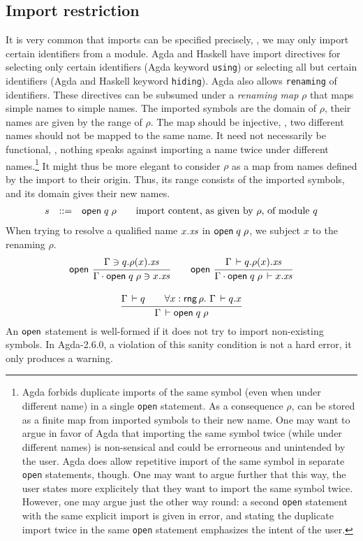 \documentclass{article}
\theoremstyle{definition}
\theoremstyle{plain}
\theoremstyle{remark}
\begin{document}
\subsection{Import restriction}

It is very common that imports can be specified precisely, \ie, we may
only import certain identifiers from a module.  Agda and Haskell have
import directives for selecting only certain identifiers (Agda keyword
\texttt{using}) or selecting all but certain identifiers (Agda and
Haskell keyword \texttt{hiding}).  Agda also allows \texttt{renaming}
of identifiers.  These directives can be subsumed under a
\emph{renaming map} $\rho$ that maps simple names to simple names.
The imported symbols are the domain of $\rho$, their names are
given by the range of $\rho$.  The map should be injective, \ie, two
different names should not be mapped to the same name.  It need not
necessarily be functional, \ie, nothing speaks against importing a name
twice under different names.\footnote{Agda forbids duplicate imports
  of the same symbol (even when under different name) in a single
  \texttt{open} statement.
  As a consequence $\rho$, can be stored as a finite map from
  imported symbols to their new name.
  One may want to argue in favor of Agda
  that importing the same symbol twice
  (while under different names) is non-sensical and could be
  errorneous and unintended by the user.  Agda does allow repetitive
  import of the same symbol in separate \texttt{open} statements,
  though.  One may want to argue further that this way, the user states more
  explicitely that they want to import the same symbol twice.
  However, one may argue just the other way round: a second
  \texttt{open} statement with the same explicit import
  is given in error, and stating the duplicate import
  twice in the same \texttt{open} statement emphasizes the intent of
  the user.}
It might thus be more elegant to
consider $\rho$ as a map from names defined by the import to their
origin.  Thus, its range consists of the imported symbols, and its
domain gives their new names.
\[
\begin{array}{lrl@{\qquad}l}
  s & ::= & \mopenr q \rho & \mbox{import content, as given by $\rho$, of module $q$}
\end{array}
\]
When trying to resolve a qualified name $x.\mathit{xs}$ in $\mathsf{open}\;q\;\rho$, we
subject $x$ to the renaming $\rho$.
\begin{gather*}
  \nru{\ropen
     }{\Contains \Gamma {q.\rho(x).\vxs}
     }{\Contains {\Gamma \sep \mopenr {q} \rho} {x.\vxs}}
\qquad
  \nru{\ropen
     }{\Declares \Gamma {q.\rho(x).\vxs}
     }{\Declares {\Gamma \sep \mopenr {q} \rho} {x.\vxs}}
\\[2ex]
  \ru{\Declares \Gamma q  \qquad
      \forall x:\rng \rho.\ \Declares \Gamma {q.x}
    }{\WContent \Gamma {\mopenr q \rho}}
\end{gather*}
An $\mathsf{open}$ statement is well-formed if it does not try to import
non-existing symbols.  In Agda-2.6.0, a violation of this sanity
condition is not a hard error, it only produces a warning.
\end{document}
